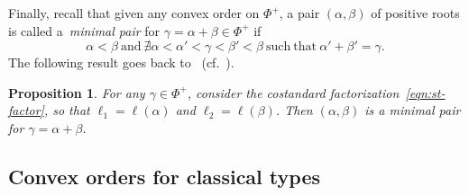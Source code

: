 \documentclass[pdftex]{sigma}
\numberwithin{equation}{section}
\newtheorem{Proposition}[Theorem]{Proposition}
 { \theoremstyle{definition}
\newtheorem{Definition}[Theorem]{Definition}
\newtheorem{Note}[Theorem]{Note}
\newtheorem{Example}[Theorem]{Example}
\newtheorem{Remark}[Theorem]{Remark} }
\begin{document}
Finally, recall that given any convex order on $\Phi^+$, a pair $(\alpha,\beta)$ of positive roots is called a~\textit{minimal pair} for $\gamma=\alpha+\beta\in \Phi^+$ if
\begin{equation}\label{eq:min_pair}
 \alpha < \beta \ \mathrm{and} \ \nexists
 \alpha < \alpha' < \gamma < \beta' < \beta \ \mathrm{such\ that} \ \alpha' + \beta' = \gamma.
\end{equation}
The following result goes back to~\cite{L, Ro} (cf.\ \cite[Proposition~2.38]{NT}).

\begin{Proposition}\label{prop:minimial-via-standard}
For any $\gamma\in \Phi^+$, consider the costandard factorization~\eqref{eqn:st-factor}, so that $\ell_1=\ell(\alpha)$ and $\ell_2=\ell(\beta)$. Then $(\alpha,\beta)$ is a minimal pair for $\gamma=\alpha+\beta$.
\end{Proposition}

\subsection{Convex orders for classical types}\label{ssec:ABCD-orders}
\end{document}

